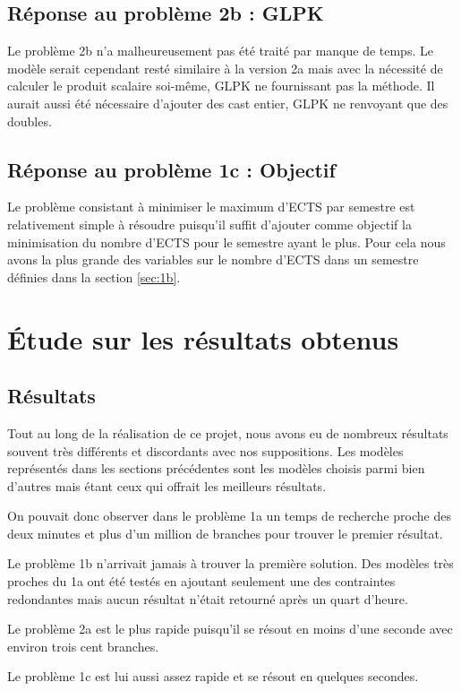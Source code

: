 \documentclass[a4paper, 11pt]{article}
\begin{document}
\subsection{Réponse au problème 2b : GLPK}\label{sec:2b}
Le problème 2b n'a malheureusement pas été traité par manque de temps. Le modèle serait cependant resté similaire à la version 2a mais avec la nécessité de calculer le produit scalaire soi-même, GLPK ne fournissant pas la méthode. Il aurait aussi été nécessaire d'ajouter des cast entier, GLPK ne renvoyant que des doubles.

\subsection{Réponse au problème 1c : Objectif}\label{sec:1c}
Le problème consistant à minimiser le maximum d'ECTS par semestre est relativement simple à résoudre puisqu'il suffit d'ajouter comme objectif la minimisation du nombre d'ECTS pour le semestre ayant le plus. Pour cela nous avons la plus grande des variables sur le nombre d'ECTS dans un semestre définies dans la section \ref{sec:1b}.

\section{Étude sur les résultats obtenus}
\subsection{Résultats}
Tout au long de la réalisation de ce projet, nous avons eu de nombreux résultats souvent très différents et discordants avec nos suppositions.
Les modèles représentés dans les sections précédentes sont les modèles choisis parmi bien d'autres mais étant ceux qui offrait les meilleurs résultats.

 On pouvait donc observer dans le problème 1a un temps de recherche proche des deux minutes et plus d'un million de branches pour trouver le premier résultat.

Le problème 1b n'arrivait jamais à trouver la première solution. Des modèles très proches du 1a ont été testés en ajoutant seulement une des contraintes redondantes mais aucun résultat n'était retourné après un quart d'heure.

 Le problème 2a est le plus rapide puisqu'il se résout en moins d'une seconde avec environ trois cent branches.

Le problème 1c est lui aussi assez rapide et se résout en quelques secondes.
\end{document}
